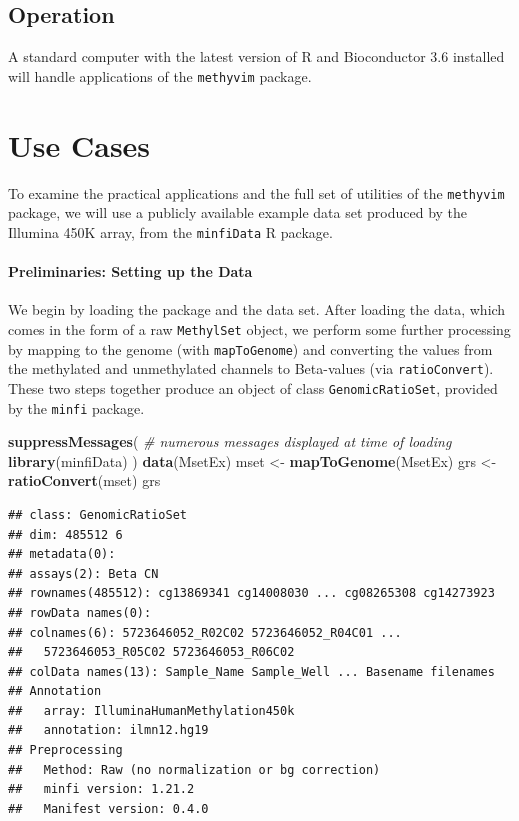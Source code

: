\documentclass[9pt,a4paper,]{extarticle}
\newenvironment{Shaded}{\begin{snugshade}}{\end{snugshade}}
\newcommand{\CommentTok}[1]{\textcolor[rgb]{0.56,0.35,0.01}{\textit{#1}}}
\newcommand{\KeywordTok}[1]{\textcolor[rgb]{0.13,0.29,0.53}{\textbf{#1}}}
\newcommand{\NormalTok}[1]{#1}
\newcommand{\StringTok}[1]{\textcolor[rgb]{0.31,0.60,0.02}{#1}}
\theoremstyle{definition}
\theoremstyle{definition}
\theoremstyle{definition}
\theoremstyle{remark}
\begin{document}
\hypertarget{operation}{%
\subsection{Operation}\label{operation}}

A standard computer with the latest version of R and Bioconductor 3.6 installed
will handle applications of the \texttt{methyvim} package.

\hypertarget{use-cases}{%
\section{Use Cases}\label{use-cases}}

To examine the practical applications and the full set of utilities of the
\texttt{methyvim} package, we will use a publicly available example data set produced
by the Illumina 450K array, from the \texttt{minfiData} R package.

\hypertarget{preliminaries-setting-up-the-data}{%
\paragraph{Preliminaries: Setting up the Data}\label{preliminaries-setting-up-the-data}}

We begin by loading the package and the data set. After loading the data, which
comes in the form of a raw \texttt{MethylSet} object, we perform some further
processing by mapping to the genome (with \texttt{mapToGenome}) and converting the
values from the methylated and unmethylated channels to Beta-values
(via \texttt{ratioConvert}). These two steps together produce an object of class
\texttt{GenomicRatioSet}, provided by the \texttt{minfi} package.

\begin{Shaded}
\begin{Highlighting}[]
\KeywordTok{suppressMessages}\NormalTok{(}
  \CommentTok{# numerous messages displayed at time of loading}
  \KeywordTok{library}\NormalTok{(minfiData)}
\NormalTok{)}
\KeywordTok{data}\NormalTok{(MsetEx)}
\NormalTok{mset <-}\StringTok{ }\KeywordTok{mapToGenome}\NormalTok{(MsetEx)}
\NormalTok{grs <-}\StringTok{ }\KeywordTok{ratioConvert}\NormalTok{(mset)}
\NormalTok{grs}
\end{Highlighting}
\end{Shaded}

\begin{verbatim}
## class: GenomicRatioSet 
## dim: 485512 6 
## metadata(0):
## assays(2): Beta CN
## rownames(485512): cg13869341 cg14008030 ... cg08265308 cg14273923
## rowData names(0):
## colnames(6): 5723646052_R02C02 5723646052_R04C01 ...
##   5723646053_R05C02 5723646053_R06C02
## colData names(13): Sample_Name Sample_Well ... Basename filenames
## Annotation
##   array: IlluminaHumanMethylation450k
##   annotation: ilmn12.hg19
## Preprocessing
##   Method: Raw (no normalization or bg correction)
##   minfi version: 1.21.2
##   Manifest version: 0.4.0
\end{verbatim}
\end{document}
